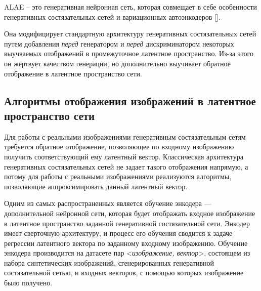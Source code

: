 ALAE \cite{ALAE} – это генеративная нейронная сеть, которая совмещает в себе особенности генеративных состязательных сетей и вариационных автоэнкодеров [].

Она модифицирует стандартную архитектуру генеративных состязательных сетей путем добавления \emph{перед} генератором и \emph{перед} дискриминатором некоторых выучваемых отображений в промежуточное латентное пространство.
Из-за этого он жертвует качеством генерации, но дополнительно выучивает обратное отображение в латентное пространство сети.


\subsection{Алгоритмы отображения изображений в латентное пространство сети}
Для работы с реальными изображениями генеративным состязательным сетям требуется обратное отображение, позволяющее по входному изображению получить соответствующий ему латентный вектор. 
Классическая архитектура генеративных состязательных сетей не задает такого отображения напрямую, а потому для работы с реальными изображениями реализуются алгоритмы, позволяющие аппроксимировать данный латентный вектор.

Одним из самых распространенных является обучение энкодера \cite{donahue2016adversarial} --- дополнительной нейронной сети, которая будет отображать входное изображение в латентное пространство заданной генеративной состязательной сети.
Энкодер имеет сверточную архитектуру, и процесс его обучения сводится к задаче регрессии латентного вектора по заданному входному изображению. 
Обучение энкодера производится на датасете пар <\emph{изображение, вектор}>, состоящем из набора синтетических изображений, сгенерированных генеративной состязательной сетью, и входных векторов, с помощью которых изображение было получено.

